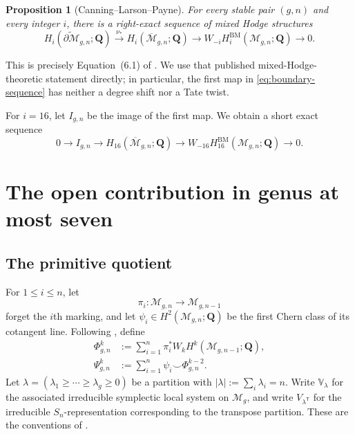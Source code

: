 \documentclass[12pt,reqno]{amsart}
\newcommand{\Q}{\mathbf{Q}}
\newcommand{\M}{\mathcal{M}}
\newcommand{\Mbar}{\overline{\mathcal{M}}}
\newcommand{\BM}{\mathrm{BM}}
\newtheorem{proposition}[theorem]{Proposition}
\theoremstyle{definition}
\theoremstyle{remark}
\begin{document}
\begin{proposition}[Canning--Larson--Payne]\label{prop:boundary-sequence}
For every stable pair $(g,n)$ and every integer $i$, there is a right-exact
sequence of mixed Hodge structures
\begin{equation}\label{eq:boundary-sequence}
 H_i(\widetilde{\partial\M}_{g,n};\Q)
 \xrightarrow{\nu_*}
 H_i(\Mbar_{g,n};\Q)
 \longrightarrow
 W_{-i}H_i^{\BM}(\M_{g,n};\Q)
 \longrightarrow0.
\end{equation}
\end{proposition}

This is precisely Equation~(6.1) of \cite{CLP}.  We use that published
mixed-Hodge-theoretic statement directly; in particular, the first map in
\eqref{eq:boundary-sequence} has neither a degree shift nor a Tate twist.

For $i=16$, let $I_{g,n}$ be the image of the first map.  We obtain a short
exact sequence
\begin{equation}\label{eq:boundary-short}
 0\longrightarrow I_{g,n}
 \longrightarrow H_{16}(\Mbar_{g,n};\Q)
 \longrightarrow W_{-16}H_{16}^{\BM}(\M_{g,n};\Q)
 \longrightarrow0.
\end{equation}

\section{The open contribution in genus at most seven}
\label{sec:open}

\subsection{The primitive quotient}

For $1\leq i\leq n$, let
\[
 \pi_i\colon\M_{g,n}\longrightarrow\M_{g,n-1}
\]
forget the $i$th marking, and let $\psi_i\in H^2(\M_{g,n};\Q)$ be the first
Chern class of its cotangent line.  Following \cite[Sections~2 and 3]{CLP},
define
\begin{align}
 \Phi^k_{g,n}
   &:=\sum_{i=1}^n\pi_i^*W_kH^k(\M_{g,n-1};\Q),
   \label{eq:Phi}\\
 \Psi^k_{g,n}
   &:=\sum_{i=1}^n\psi_i\smile\Phi^{k-2}_{g,n}.
   \label{eq:Psi}
\end{align}
Let $\lambda=(\lambda_1\geq\cdots\geq\lambda_g\geq0)$ be a partition with
$|\lambda|:=\sum_i\lambda_i=n$.  Write $\mathbb V_\lambda$ for the
associated irreducible symplectic local system on $\M_g$, and write
$V_{\lambda^{\mathsf T}}$ for the irreducible $S_n$-representation
corresponding to the transpose partition.  These are the conventions of
\cite[Section~3]{CLP}.
\end{document}
